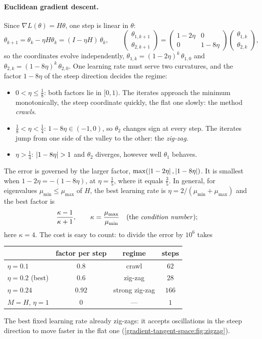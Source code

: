 \begin{notechapter}
\paragraph{Euclidean gradient descent.} Since $\nabla L(\theta) = H\theta$, one step is linear in $\theta$:
\[
  \theta_{k+1} = \theta_k - \eta H\theta_k = (I - \eta H)\,\theta_k,\qquad
  \begin{pmatrix}\theta_{1,k+1}\\\theta_{2,k+1}\end{pmatrix}
  = \begin{pmatrix}1 - 2\eta & 0\\0 & 1 - 8\eta\end{pmatrix}
    \begin{pmatrix}\theta_{1,k}\\\theta_{2,k}\end{pmatrix},
\]
so the coordinates evolve independently, $\theta_{1,k} = (1 - 2\eta)^k\,\theta_{1,0}$ and $\theta_{2,k} = (1 - 8\eta)^k\,\theta_{2,0}$. One learning
rate must serve two curvatures, and the factor $1 - 8\eta$ of the steep direction decides the regime:
\begin{itemize}[nosep]
  \item $0<\eta\leq\frac18$: both factors lie in $[0, 1)$. The iterates approach the minimum monotonically, the
        steep coordinate quickly, the flat one slowly: the method \emph{crawls}.
  \item $\frac18<\eta<\frac14$: $1 - 8\eta\in(-1, 0)$, so $\theta_2$ changes sign at every step. The iterates jump from one
        side of the valley to the other: the \emph{zig-zag}.
  \item $\eta>\frac14$: $\abs{1 - 8\eta}>1$ and $\theta_2$ diverges, however well $\theta_1$ behaves.
\end{itemize}
The error is governed by the larger factor, $\max(\left|1 - 2\eta\right|, \left|1 - 8\eta\right|)$. It is smallest when
$1 - 2\eta = -(1 - 8\eta)$, at $\eta = \frac15$, where it equals $\frac35$. In general, for eigenvalues $\mu_{\min}\leq\mu_{\max}$ of $H$, the
best learning rate is $\eta = 2/(\mu_{\min} + \mu_{\max})$ and the best factor is
\[
  \frac{\kappa - 1}{\kappa + 1},\qquad \kappa = \frac{\mu_{\max}}{\mu_{\min}}\quad\text{(the \emph{condition number})};
\]
here $\kappa = 4$. The cost is easy to count: to divide the error by $10^6$ takes
\begin{center}
\begin{tabular}{@{}lccc@{}}
\toprule
 & factor per step & regime & steps \\
\midrule
$\eta = 0.1$ & $0.8$ & crawl & $62$ \\
$\eta = 0.2$ (best) & $0.6$ & zig-zag & $28$ \\
$\eta = 0.24$ & $0.92$ & strong zig-zag & $166$ \\
$M = H$, $\eta = 1$ & $0$ & --- & $1$ \\
\bottomrule
\end{tabular}
\end{center}
The best fixed learning rate already zig-zags: it accepts oscillations in the steep direction to
move faster in the flat one (\cref{gradient-tangent-space:fig:zigzag}).


\end{notechapter}
